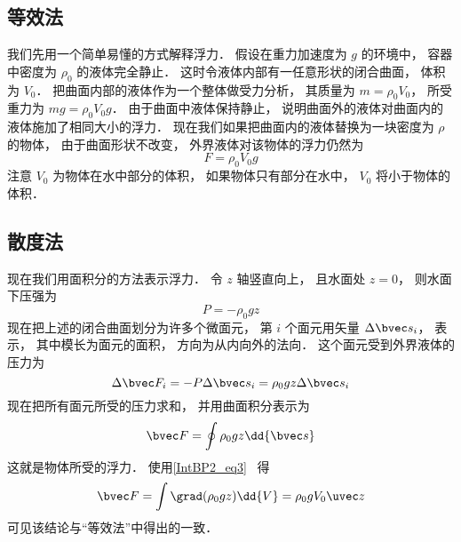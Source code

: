 
\subsection{等效法}

我们先用一个简单易懂的方式解释浮力． 假设在重力加速度为 $g$ 的环境中， 容器中密度为 $\rho_0$ 的液体完全静止． 这时令液体内部有一任意形状的闭合曲面， 体积为 $V_0$． 把曲面内部的液体作为一个整体做受力分析， 其质量为 $m = \rho_0 V_0$， 所受重力为 $mg = \rho_0 V_0 g$． 由于曲面中液体保持静止， 说明曲面外的液体对曲面内的液体施加了相同大小的浮力． 现在我们如果把曲面内的液体替换为一块密度为 $\rho$ 的物体， 由于曲面形状不改变， 外界液体对该物体的浮力仍然为
\begin{equation}
F = \rho_0 V_0 g
\end{equation}
注意 $V_0$ 为物体在水中部分的体积， 如果物体只有部分在水中， $V_0$ 将小于物体的体积．

\subsection{散度法}

现在我们用面积分的方法表示浮力． 令 $z$ 轴竖直向上， 且水面处 $z = 0$， 则水面下压强为
\begin{equation}
P = -\rho_0 g z
\end{equation}
现在把上述的闭合曲面划分为许多个微面元， 第 $i$ 个面元用矢量 $\Delta \bvec s_i$， 表示， 其中模长为面元的面积， 方向为从内向外的法向． 这个面元受到外界液体的压力为
\begin{equation}
\Delta \bvec F_i = -P\Delta \bvec s_i = \rho_0 g z \Delta \bvec s_i
\end{equation}
现在把所有面元所受的压力求和， 并用曲面积分表示为
\begin{equation}
\bvec F = \oint \rho_0 g z \dd{\bvec s}
\end{equation}
这就是物体所受的浮力． 使用\autoref{IntBP2_eq3}~ 得
\begin{equation}
\bvec F = \int \grad(\rho_0 g z) \dd{V} = \rho_0 g V_0 \uvec z
\end{equation}
可见该结论与“等效法”中得出的一致．
